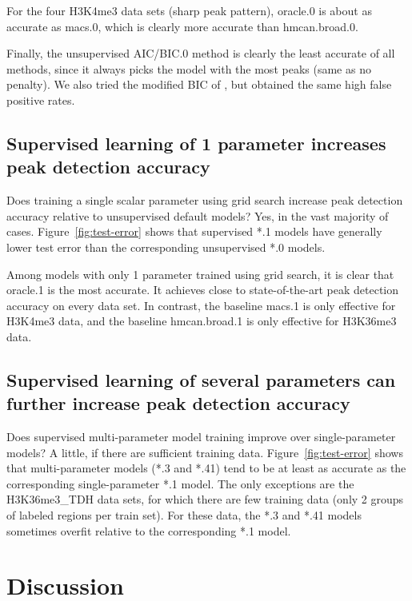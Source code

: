\documentclass{article}
\begin{document}
For the four H3K4me3 data sets (sharp peak pattern), oracle.0 is about
as accurate as macs.0, which is clearly more accurate than
hmcan.broad.0.

Finally, the unsupervised AIC/BIC.0 method is clearly the least
accurate of all methods, since it always picks the model with the most
peaks (same as no penalty). We also tried the modified BIC of
\citet{mBIC}, but obtained the same high false positive rates.

\subsection{Supervised learning of 1 parameter increases peak
  detection accuracy}

Does training a single scalar parameter using grid search increase
peak detection accuracy relative to unsupervised default models? Yes,
in the vast majority of cases. Figure~\ref{fig:test-error} shows that
supervised *.1 models have generally lower test error than the
corresponding unsupervised *.0 models.

Among models with only 1 parameter trained using grid search, it is
clear that oracle.1 is the most accurate. It achieves close to
state-of-the-art peak detection accuracy on every data set. In
contrast, the baseline macs.1 is only effective for H3K4me3 data, and
the baseline hmcan.broad.1 is only effective for H3K36me3 data.

\subsection{Supervised learning of several parameters can further
  increase peak detection accuracy}

Does supervised multi-parameter model training improve over
single-parameter models? A little, if there are sufficient training
data. Figure~\ref{fig:test-error} shows that multi-parameter models
(*.3 and *.41) tend to be at least as accurate as the corresponding
single-parameter *.1 model. The only exceptions are the H3K36me3\_TDH
data sets, for which there are few training data (only 2 groups of
labeled regions per train set). For these data, the *.3 and
*.41 models sometimes overfit relative to the corresponding *.1 model.

\section{Discussion}
\label{sec:discussion}
\end{document}

